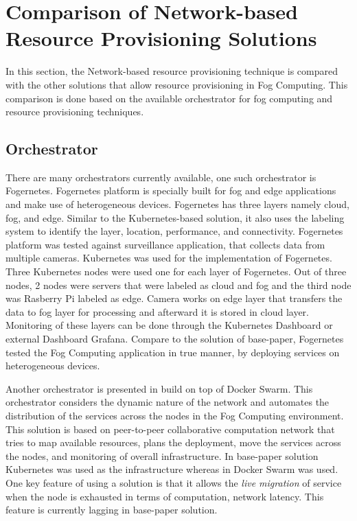 \section{Comparison of Network-based Resource Provisioning Solutions}
\label{sec:related_work}
In this section, the Network-based resource provisioning technique is compared with the other solutions that allow resource provisioning in Fog Computing. This comparison is done based on the available orchestrator for fog computing and resource provisioning techniques.
\subsection{Orchestrator}
\label{sec:infra}
There are many orchestrators currently available, one such orchestrator is Fogernetes\cite{Wobker2018}. Fogernetes\cite{Wobker2018} platform is specially built for fog and edge applications and make use of heterogeneous devices. Fogernetes\cite{Wobker2018} has three layers namely cloud, fog, and edge. Similar to the Kubernetes-based solution\cite{Santos2019}, it also uses the labeling system to identify the layer, location, performance, and connectivity\cite{Wobker2018}. Fogernetes\cite{Wobker2018} platform was tested against surveillance application, that collects data from multiple cameras. Kubernetes was used for the implementation of Fogernetes\cite{Wobker2018}. Three Kubernetes nodes were used one for each layer of Fogernetes\cite{Wobker2018}. Out of three nodes, 2 nodes were servers that were labeled as cloud and fog and the third node was Rasberry Pi labeled as edge. Camera works on edge layer that transfers the data to fog layer for processing and afterward it is stored in cloud layer. Monitoring of these layers can be done through the  Kubernetes Dashboard or external Dashboard Grafana. Compare to the solution of base-paper\cite{Santos2019}, Fogernetes\cite{Wobker2018} tested the Fog Computing application in true manner, by deploying services on heterogeneous devices. \par
Another orchestrator is presented in \cite{Reale} build on top of Docker Swarm. This orchestrator considers the dynamic nature of the network and automates the distribution of the services across the nodes in the Fog Computing environment\cite{Reale}. This solution is based on peer-to-peer collaborative computation network that tries to map available resources, plans the deployment, move the services across the nodes, and monitoring of overall infrastructure\cite{Reale}. In base-paper solution\cite{Santos2019} Kubernetes was used as the infrastructure whereas in \cite{Reale} Docker Swarm was used. One key feature of using a solution\cite{Reale} is that it allows the \emph{live migration} of service when the node is exhausted in terms of computation, network latency. This feature is currently lagging in base-paper solution\cite{Santos2019}.
